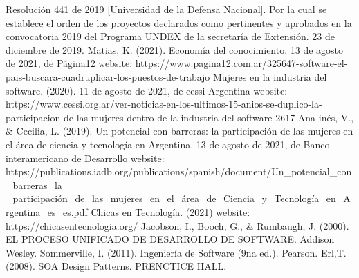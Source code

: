 \begin{thebibliography}{0}
   Resolución 441 de 2019 [Universidad de la Defensa Nacional]. Por la cual se establece el orden de los proyectos declarados como pertinentes y aprobados en la convocatoria 2019 del Programa UNDEX de la secretaría de Extensión. 23 de diciembre de 2019.
   Matias, K. (2021). Economía del conocimiento. 13 de agosto de 2021, de Página12 website: https://www.pagina12.com.ar/325647-software-el-pais-buscara-cuadruplicar-los-puestos-de-trabajo
   Mujeres en la industria del software. (2020). 11 de agosto de 2021, de cessi Argentina website: https://www.cessi.org.ar/ver-noticias-en-los-ultimos-15-anios-se-duplico-la-participacion-de-las-mujeres-dentro-de-la-industria-del-software-2617
   Ana inés, V., \& Cecilia, L. (2019). Un potencial con barreras: la participación de las mujeres en el área de ciencia y tecnología en Argentina. 13 de agosto de 2021, de Banco interamericano de Desarrollo website: https://publications.iadb.org/publications/spanish/document/Un\_potencial\_con\_barreras\_la
  \_participación\_de\_las\_mujeres\_en\_el\_área\_de\_Ciencia\_y\_Tecnología\_en\_Argentina\_es\_es.pdf 
   Chicas en Tecnología. (2021) website: https://chicasentecnologia.org/
   Jacobson, I., Booch, G., \& Rumbaugh, J. (2000). EL PROCESO UNIFICADO DE DESARROLLO DE SOFTWARE. Addison Wesley.
   Sommerville, I. (2011). Ingeniería de Software (9na ed.). Pearson.
   Erl,T. (2008). SOA Design Patterns. PRENCTICE HALL.
   
\end{thebibliography}
